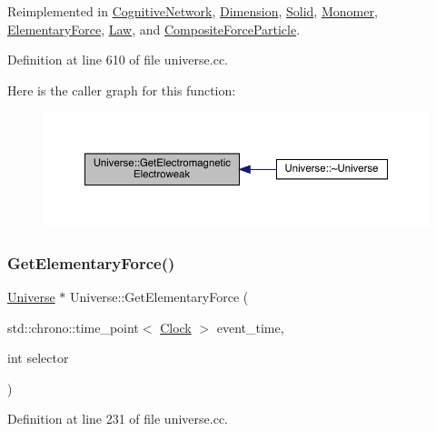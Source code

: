 Reimplemented in \hyperlink{class_cognitive_network_a8c4e0454068f714691ae250f795cdb67}{Cognitive\+Network}, \hyperlink{class_dimension_ae1babb1fa280c35966d7ee3de6655e4d}{Dimension}, \hyperlink{class_solid_aff7ec13bcc584d8330e3f3a1b371bbe6}{Solid}, \hyperlink{class_monomer_a9b270cd1293bc9635813ead284bd3881}{Monomer}, \hyperlink{class_elementary_force_a58e503f2f3a7410f034a2a04bca560d1}{Elementary\+Force}, \hyperlink{class_law_ae4ccaca7b78905f416f35f9556b1923c}{Law}, and \hyperlink{class_composite_force_particle_ac26d7aab0daefcf13c68aba9e0f2ed53}{Composite\+Force\+Particle}.



Definition at line 610 of file universe.\+cc.

Here is the caller graph for this function\+:
\nopagebreak
\begin{figure}[H]
\begin{center}
\leavevmode
\includegraphics[width=350pt]{class_universe_a9f099605c082e7fa755787a6a8cab7ba_icgraph}
\end{center}
\end{figure}
\mbox{\label{class_universe_a9506017d944cb64e67567477c1505a53}} 
\subsubsection{\texorpdfstring{Get\+Elementary\+Force()}{GetElementaryForce()}}
{\footnotesize\ttfamily \hyperlink{class_universe}{Universe} $\ast$ Universe\+::\+Get\+Elementary\+Force (\begin{DoxyParamCaption}\item[{std\+::chrono\+::time\+\_\+point$<$ \hyperlink{universe_8h_a0ef8d951d1ca5ab3cfaf7ab4c7a6fd80}{Clock} $>$}]{event\+\_\+time,  }\item[{int}]{selector }\end{DoxyParamCaption})}



Definition at line 231 of file universe.\+cc.

